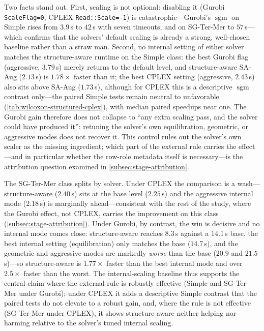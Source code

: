 \documentclass[AMA,Times1COL]{WileyNJDv5} %
\newcommand{\methodAug}{SA-Aug}
\newcommand{\sgm}{\ensuremath{\operatorname{sgm}}}
\providecommand{\DIFadd}[1]{{\protect\color{blue} \sf #1}} %
\begin{document}
\DIFadd{Two facts stand out. First, scaling is not optional: disabling it (Gurobi
\texttt{ScaleFlag=0}, CPLEX \texttt{Read::Scale=-1}) is catastrophic---Gurobi's $\sgm$ on
Simple rises from $3.9$\,s to $42$\,s with seven timeouts, and on SG-Ter-Mer to $57$\,s---which
confirms that the solvers' default scaling is already a strong, well-chosen baseline rather
than a straw man. Second, no internal setting of either
solver matches the structure-aware runtime on the Simple class: the best Gurobi flag
(aggressive, $3.79$\,s) merely returns to the default level, and structure-aware \methodAug{}
($2.13$\,s) is $1.78\times$ faster than it; the best CPLEX setting (aggressive, $2.43$\,s) also
sits above \methodAug{} ($1.73$\,s), although for CPLEX this is a descriptive $\sgm$ contrast
only---the paired Simple tests remain neutral to unfavorable
(\cref{tab:wilcoxon-structured-cplex}), with median paired speedups near one. The Gurobi gain
therefore does not collapse to ``any extra scaling pass, and the solver could have produced
it'': retuning the solver's own equilibration, geometric, or aggressive modes does not recover
it. This control rules out the solver's own scaler as the missing ingredient; which part of the
external rule carries the effect---and in particular whether the row-role metadata itself is
necessary---is the attribution question examined in \cref{subsec:stage-attribution}.
}

\DIFadd{The SG-Ter-Mer class splits by solver. Under CPLEX the comparison is a wash---structure-aware
($2.40$\,s) sits at the base level ($2.25$\,s) and the aggressive internal mode ($2.18$\,s) is
marginally ahead---consistent with the rest of the study, where the Gurobi effect, not CPLEX,
carries the improvement on this class (\cref{subsec:stage-attribution}). Under Gurobi, by
contrast, the win is decisive and no internal mode comes close: structure-aware reaches
$8.3$\,s against a $14.1$\,s base, the best internal setting (equilibration) only matches the
base ($14.7$\,s), and the geometric and aggressive modes are markedly \emph{worse} than the
base ($20.9$ and $21.5$\,s)---so structure-aware is $1.77\times$ faster than the best internal
mode and over $2.5\times$ faster than the worst. The internal-scaling baseline thus supports the
central claim where the external rule is robustly effective (Simple and SG-Ter-Mer under
Gurobi); under CPLEX it adds a descriptive Simple contrast that the paired tests do not
elevate to a robust gain, and, where the rule is not effective (SG-Ter-Mer under CPLEX), it
shows structure-aware neither helping nor harming relative to the solver's tuned internal
scaling.
}
\end{document}
